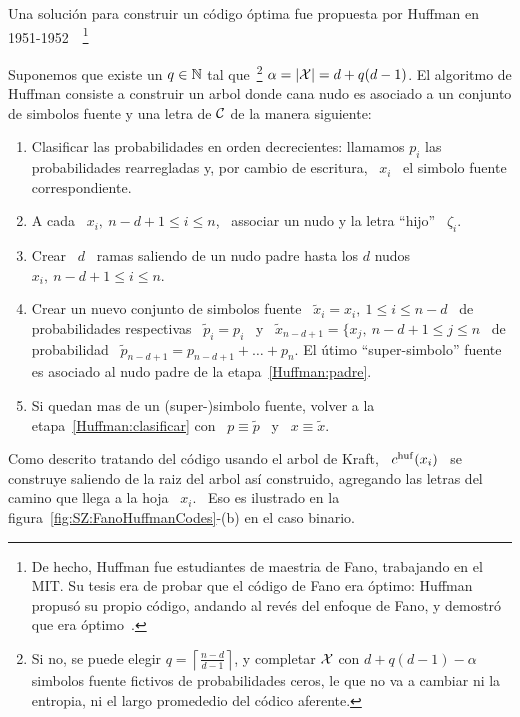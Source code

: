 Una soluci\'on para construir un  c\'odigo \'optima fue propuesta por Huffman en
1951-1952~\cite{Huf52,  Pig03}~\footnote{De hecho,  Huffman  fue estudiantes  de
  maestria  de Fano,  trabajando  en el  MIT.  Su  tesis  era de  probar que  el
  c\'odigo de Fano  era \'optimo: Huffman propus\'o su  propio c\'odigo, andando
  al rev\'es del enfoque de Fano, y demostr\'o que era \'optimo~\cite{Sti91}.}
%
\begin{definicion}
  Suponemos que existe un $q \in \mathbb{N}$ tal que~\footnote{Si no, se puede elegir
    $q = \left\lceil \frac{n-d}{d-1} \right\rceil$,  y completar $\mathcal{X}$ con $d + q
    (d-1) - \alpha$ simbolos fuente  fictivos de probabilidades ceros, le que no
    va a cambiar ni la entropia,  ni el largo promededio del c\'odico aferente.}
  $\alpha = |\mathcal{X}| = d + q (d-1)$. El algoritmo de Huffman consiste a construir un
  arbol donde cana nudo es asociado a un conjunto de simbolos fuente y una letra
  de $\mathcal{C}$ de la manera siguiente:
  \begin{enumerate}
  \item\label{Huffman:clasificar}   Clasificar  las   probabilidades   en  orden
    decrecientes: llamamos  $p_i$ las probabilidades rearregladas  y, por cambio
    de escritura, \ $x_i$ \ el simbolo fuente correspondiente.
  \item\label{Huffman:codigolocal}  A cada  \ $x_i,  \: n-d+1  \le i  \le  n$, \
    associar un nudo y la letra ``hijo'' \ $\zeta_i$.
  \item\label{Huffman:padre} Crear \ $d$ \ ramas saliendo de un nudo padre hasta los
    $d$ nudos $x_i, \: n-d+1 \le i \le n$.
  \item\label{Huffman:reconfiguracion}  Crear  un  nuevo  conjunto  de  simbolos
    fuente \  $\widetilde{x}_i = x_i,  \: 1 \le  i \le n-d$ \  de probabilidades
    respectivas \ $\widetilde{p}_i = p_i$ \ y \ $\widetilde{x}_{n-d+1} = \{ x_j,
    \: n-d+1 \le j \le n$ \ de probabilidad \ $\widetilde{p}_{n-d+1} = p_{n-d+1}
    + \ldots  + p_n$.  El \'utimo ``super-simbolo''  fuente es asociado  al nudo
    padre de la etapa~\ref{Huffman:padre}.
  \item   Si  quedan   mas   de   un  (super-)simbolo   fuente,   volver  a   la
    etapa~\ref{Huffman:clasificar}  con \  $p  \equiv \widetilde{p}$  \  y \  $x
    \equiv \widetilde{x}$.
  \end{enumerate}
  Como descrito tratando del c\'odigo  usando el arbol de Kraft, \ $c^{\mathrm{huf}}(x_i)$
  \ se construye  saliendo de la raiz del arbol  as\'i construido, agregando las
  letras  del camino que  llega a  la hoja  \ $x_i$.  \ Eso  es ilustrado  en la
  figura~\ref{fig:SZ:FanoHuffmanCodes}-(b) en el caso binario.
\end{definicion}
